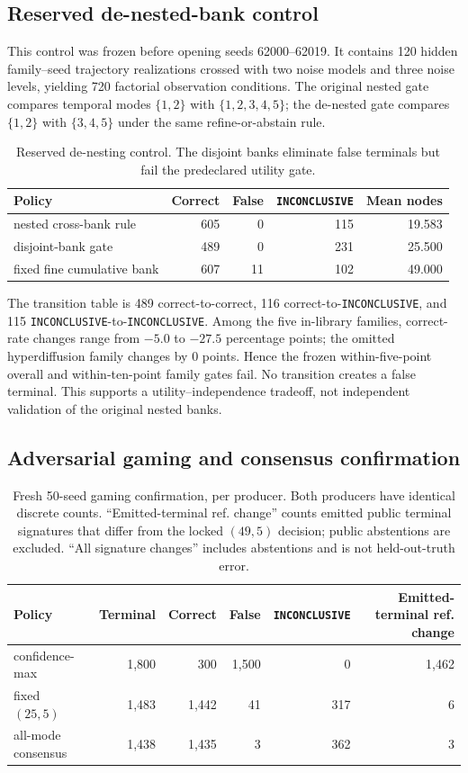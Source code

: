 \documentclass{article}
\newcommand{\INC}{\texttt{INCONCLUSIVE}\xspace}
\begin{document}
\subsection{Reserved de-nested-bank control}
This control was frozen before opening seeds 62000--62019. It contains 120 hidden family--seed
trajectory realizations crossed with two noise models and three noise levels, yielding 720
factorial observation conditions. The original nested gate compares temporal modes $\{1,2\}$
with $\{1,2,3,4,5\}$; the de-nested gate compares $\{1,2\}$ with $\{3,4,5\}$ under the same
refine-or-abstain rule.
\begin{table}[ht]
\centering\small
\caption{Reserved de-nesting control. The disjoint banks eliminate false terminals but fail the
predeclared utility gate.}
\begin{tabular}{lrrrr}
\toprule
Policy & Correct & False & \INC & Mean nodes \\
\midrule
nested cross-bank rule & 605 & 0 & 115 & 19.583 \\
disjoint-bank gate & 489 & 0 & 231 & 25.500 \\
fixed fine cumulative bank & 607 & 11 & 102 & 49.000 \\
\bottomrule
\end{tabular}
\end{table}
The transition table is 489 correct-to-correct, 116 correct-to-\INC, and 115
\INC-to-\INC. Among the five in-library families, correct-rate changes range from $-5.0$ to
$-27.5$ percentage points; the omitted hyperdiffusion family changes by $0$ points. Hence the
frozen within-five-point overall and within-ten-point family gates fail. No transition creates
a false terminal. This supports a utility--independence tradeoff, not independent validation of
the original nested banks.

\subsection{Adversarial gaming and consensus confirmation}
\begin{table}[ht]
\centering\small
\caption{Fresh 50-seed gaming confirmation, per producer. Both producers have identical discrete
counts. ``Emitted-terminal ref. change'' counts emitted public terminal signatures that differ from
the locked $(49,5)$ decision; public abstentions are excluded. ``All signature changes'' includes
abstentions and is not held-out-truth error.}
\begin{tabular}{lrrrrr}
\toprule
Policy & Terminal & Correct & False & \INC & Emitted-terminal ref. change \\
\midrule
confidence-max & 1,800 & 300 & 1,500 & 0 & 1,462 \\
fixed $(25,5)$ & 1,483 & 1,442 & 41 & 317 & 6 \\
all-mode consensus & 1,438 & 1,435 & 3 & 362 & 3 \\
\bottomrule
\end{tabular}
\end{table}
\end{document}
